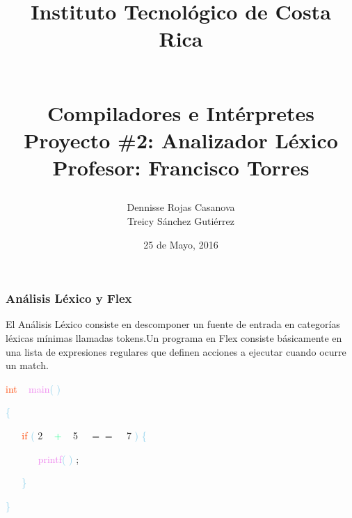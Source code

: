 \documentclass[10, usernames, dvipsnames]{beamer}
\begin{document}
 
\title{
\begin{LARGE}
Instituto Tecnol\'ogico de Costa Rica
\end{LARGE}
\newline
\begin{Large}
\\Compiladores e Int\'erpretes
\\Proyecto \#2: Analizador L\'exico
\\Profesor: Francisco Torres
\end{Large}
}
\author{Dennisse Rojas Casanova
\\Treicy S\'anchez Guti\'errez}
\date{25 de Mayo, 2016}
\maketitle 
\begin{frame} 
\frametitle{An\'alisis L\'exico y Flex} 
El An\'alisis L\'exico consiste en descomponer un fuente de entrada en categor\'ias l\'exicas m\'inimas llamadas tokens.Un programa en Flex consiste b\'asicamente en una lista de expresiones regulares que definen acciones a ejecutar cuando ocurre un match.\end{frame} 
\begin{frame}
\textcolor{OrangeRed}{int}
\textcolor{White}{\ }
\textcolor{Violet}{main}\textcolor{SkyBlue}{(}
\textcolor{SkyBlue}{)}

 \textcolor{SkyBlue}{\{ }

 \textcolor{White}{\ }
\textcolor{White}{\ }
\textcolor{OrangeRed}{if}
\textcolor{SkyBlue}{(}
\textcolor{RedViolet}{2}
\textcolor{White}{\ }
\textcolor{SpringGreen}{+}
\textcolor{White}{\ }
\textcolor{RedViolet}{5}
\textcolor{White}{\ }
\textcolor{OliveGreen}{$==$}
\textcolor{White}{\ }
\textcolor{RedViolet}{7}
\textcolor{SkyBlue}{)}
\textcolor{SkyBlue}{\{ }

 \textcolor{White}{\ }
\textcolor{White}{\ }
\textcolor{White}{\ }
\textcolor{White}{\ }
\textcolor{Violet}{printf}\textcolor{SkyBlue}{(}
\textcolor{Orchid}{}
\textcolor{SkyBlue}{)}
\textcolor{Sepia}{;}

 \textcolor{White}{\ }
\textcolor{White}{\ }
\textcolor{SkyBlue}{\} }

 \textcolor{SkyBlue}{\} }

 \end{frame}
\end{document}

